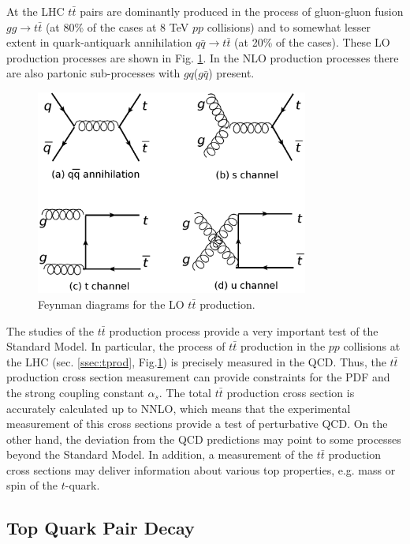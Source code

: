 At the LHC $t\bar{t}$ pairs are dominantly produced in the process of gluon-gluon fusion $gg \rightarrow t\bar{t}$ (at 80\% of the cases at 8 TeV $pp$ collisions) 
and to somewhat lesser extent in quark-antiquark annihilation $q\bar{q} \rightarrow t\bar{t}$ (at 20\% of the cases). These LO production processes are shown in 
Fig. \ref{fig:LO_tt_prod}. In the NLO production processes there are also partonic sub-processes with $gq$($g\bar{q}$) present.

\begin{figure}[h]
  \centering
  \includegraphics[width=0.8\textwidth]{01_Theory_SM/plots/LO_tt_production_uniform.png}
  \caption{Feynman diagrams for the LO $t\bar{t}$ production.}
  \label{fig:LO_tt_prod}
\end{figure}

The studies of the $t\bar{t}$ production process provide a very important test of the Standard Model. 
In particular, the process of $t\bar{t}$ production in the $pp$ collisions at the LHC (sec. \ref{ssec:tprod}, Fig.\ref{fig:LO_tt_prod})
is precisely measured in the QCD. Thus, the $t\bar{t}$ production cross section measurement can provide constraints for the PDF and the strong coupling constant $\alpha_s$.
The total $t\bar{t}$ production cross section is accurately calculated up to NNLO, which means that the experimental measurement of this cross sections provide a 
test of perturbative QCD.
On the other hand, the deviation from the QCD predictions may point to some processes beyond the Standard Model. In addition, a measurement of the $t\bar{t}$ production 
cross sections may deliver information about various top properties, e.g. mass or spin of the $t$-quark.

\subsection{Top Quark Pair Decay}\label{ssec:tdecay}

